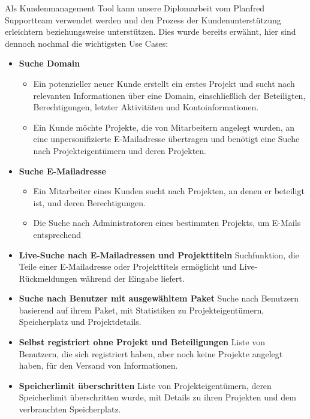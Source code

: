 Als Kundenmanagement Tool kann unsere Diplomarbeit vom Planfred Supportteam verwendet werden und den Prozess der Kundenunterstützung erleichtern beziehungsweise unterstützen.
Dies wurde bereits erwähnt, hier sind dennoch nochmal die wichtigsten Use Cases:

\begin{itemize}
    \item \textbf{Suche Domain}
        \begin{itemize}
            \item Ein potenzieller neuer Kunde erstellt ein erstes Projekt und sucht nach relevanten Informationen über eine Domain, einschließlich der Beteiligten, Berechtigungen, letzter Aktivitäten und Kontoinformationen.
            \item  Ein Kunde möchte Projekte, die von Mitarbeitern angelegt wurden, an eine unpersonifizierte E-Mailadresse übertragen und benötigt eine Suche nach Projekteigentümern und deren Projekten.
        \end{itemize}
    \item \textbf{Suche E-Mailadresse}
        \begin{itemize}
            \item Ein Mitarbeiter eines Kunden sucht nach Projekten, an denen er beteiligt ist, und deren Berechtigungen.
            \item  Die Suche nach Administratoren eines bestimmten Projekts, um E-Mails entsprechend 
        \end{itemize}
    \item \textbf{Live-Suche nach E-Mailadressen und Projekttiteln}
        \newline
        Suchfunktion, die Teile einer E-Mailadresse oder Projekttitels ermöglicht und Live-Rückmeldungen während der Eingabe liefert.
    \item \textbf{Suche nach Benutzer mit ausgewähltem Paket}
        \newline
        Suche nach Benutzern basierend auf ihrem Paket, mit Statistiken zu Projekteigentümern, Speicherplatz und Projektdetails.
    \item \textbf{Selbst registriert ohne Projekt und Beteiligungen}
        \newline
        Liste von Benutzern, die sich registriert haben, aber noch keine Projekte angelegt haben, für den Versand von Informationen.
    \item \textbf{Speicherlimit überschritten}
        \newline
        Liste von Projekteigentümern, deren Speicherlimit überschritten wurde, mit Details zu ihren Projekten und dem verbrauchten Speicherplatz.

\end{itemize}
